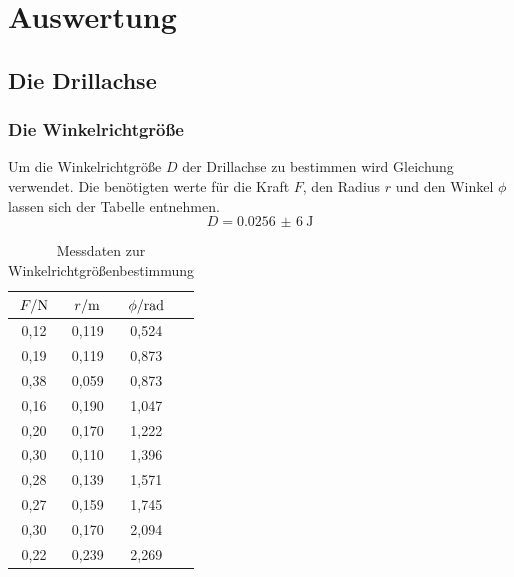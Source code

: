 \section{Auswertung}
\subsection{Die Drillachse}
\subsubsection{Die Winkelrichtgröße}
Um die Winkelrichtgröße $D$ der Drillachse zu bestimmen wird Gleichung
verwendet. Die benötigten werte für die Kraft $F$, den Radius $r$ und den Winkel $\phi$ lassen sich der Tabelle %
entnehmen.
\[D=\SI{0,0256(6)}{\joule}\]
\begin{table}
	\centering
	\caption{Messdaten zur Winkelrichtgrößenbestimmung}
	\begin{tabular}{S[table-format=3.2] S[table-format=3.2]S[table-format=3.2]S[table-format=3.2]}
		\toprule
		{$F/\si[per-mode=reciprocal]{\newton}$}&{$r/\si[per-mode=reciprocal]{\metre}$}&{$\phi/\si[per-mode=reciprocal]{\radian}$} \\
		,12 & 0,119 & 0,524 \\
		0,19 & 0,119 & 0,873 \\		
		0,38 & 0,059 & 0,873 \\
		0,16 & 0,190 & 1,047 \\
		0,20 & 0,170 & 1,222 \\
		0,30 & 0,110 & 1,396 \\
		0,28 & 0,139 & 1,571 \\	
		0,27 & 0,159 & 1,745 \\
		0,30 & 0,170 & 2,094 \\
		0,22 & 0,239 & 2,269 \\
		\bottomrule
	\end{tabular}
\end{table}
